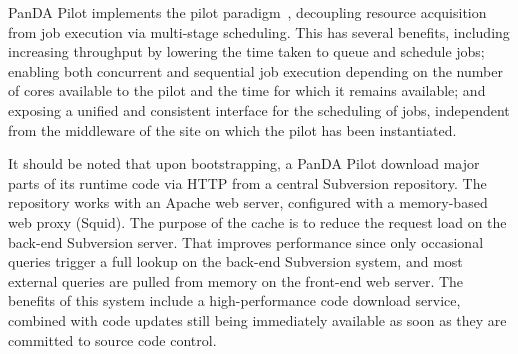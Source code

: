 
PanDA Pilot implements the pilot paradigm~\cite{pilot_review}, decoupling
resource acquisition from job execution via multi-stage scheduling. This has
several benefits, including increasing throughput by lowering the time taken to
queue and schedule jobs; enabling both concurrent and sequential job execution
depending on the number of cores available to the pilot and the time for which
it remains available; and exposing a unified and consistent interface for the
scheduling of jobs, independent from the middleware of the site on which the
pilot has been instantiated.



It should be noted that upon bootstrapping, a PanDA Pilot download major parts
of its runtime code via HTTP from a central Subversion repository. The
repository works with an Apache web server, configured with a memory-based web
proxy (Squid). The purpose of the cache is to reduce the request load on the
back-end Subversion server. That improves performance  since only occasional queries trigger a full lookup on the
back-end Subversion system, and most external queries are pulled from memory on
the front-end web server. The benefits of this system include a high-performance
code download service, combined with code updates still being immediately
available as soon as they are committed to source code control.

